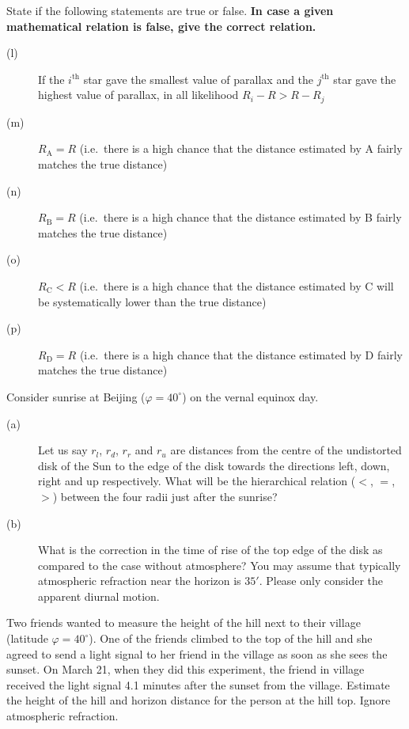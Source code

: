 State if the following statements are true or false. \textbf{In case a given
mathematical relation is false, give the correct relation.}

\begin{description}
\item[(l)] If the $i^{\mathrm{th}}$ star gave the smallest value of parallax
  and the $j^{\mathrm{th}}$ star gave the highest value of parallax, in all
  likelihood $R_i - R > R - R_j$
\item[(m)] $R_{\mathrm{A}} = R$ (i.e.\ there is a high chance that the distance
  estimated by A fairly matches the true distance)
\item[(n)] $R_{\mathrm{B}} = R$ (i.e.\ there is a high chance that the distance
  estimated by B fairly matches the true distance)
\item[(o)] $R_{\mathrm{C}} < R$ (i.e.\ there is a high chance that the distance
  estimated by C will be systematically lower than the true distance)
\item[(p)] $R_{\mathrm{D}} = R$ (i.e.\ there is a high chance that the distance
  estimated by D fairly matches the true distance)
\end{description}

Consider sunrise at Beijing ($\varphi = 40^\circ$) on the vernal equinox day.

\begin{description}
\item[(a)] Let us say $r_l$, $r_d$, $r_r$ and $r_u$ are distances from the
  centre of the undistorted disk of the Sun to the edge of the disk towards the
  directions left, down, right and up respectively. What will be the
  hierarchical relation ($<$, $=$, $>$) between the four radii just after the
  sunrise?
\item[(b)] What is the correction in the time of rise of the top edge of the
  disk as compared to the case without atmosphere? You may assume that
  typically atmospheric refraction near the horizon is $35'$. Please only
  consider the apparent diurnal motion.
\end{description}

Two friends wanted to measure the height of the hill next to their village
(latitude $\varphi = 40^\circ$). One of the friends climbed to the top of the
hill and she agreed to send a light signal to her friend in the village as soon
as she sees the sunset. On March 21, when they did this experiment, the friend
in village received the light signal 4.1 minutes after the sunset from the
village. Estimate the height of the hill and horizon distance for the person at
the hill top. Ignore atmospheric refraction.

